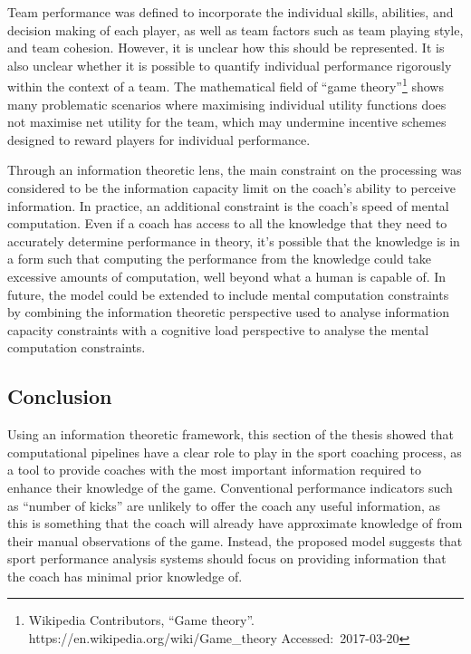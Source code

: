 Team performance was defined to incorporate the
individual skills, abilities, and decision making of each player, as
well as team factors such as team playing style, and team cohesion.
However, it is unclear how this should be represented. It is also
unclear whether it is possible to quantify individual performance
rigorously within the context of a team. The mathematical field of
``game theory''\footnote{Wikipedia Contributors, ``Game theory''.
  https://en.wikipedia.org/wiki/Game\_theory Accessed:~2017-03-20} shows
many problematic scenarios where maximising individual utility functions
does not maximise net utility for the team, which may undermine
incentive schemes designed to reward players for individual performance.

Through an information theoretic lens, the main constraint on the processing was considered to be the information capacity limit on the coach's ability to perceive
information. In practice, an additional constraint is the coach's speed
of mental computation. Even if a coach has access to all the knowledge
that they need to accurately determine performance in theory, it's
possible that the knowledge is in a form such that computing the
performance from the knowledge could take excessive amounts of
computation, well beyond what a human is capable of. In future, the model could be extended to include mental computation constraints by combining the information theoretic perspective used to analyse information capacity constraints with a cognitive load perspective to analyse the mental computation constraints.



\subsection{Conclusion}\label{conclusion-infotheory}

Using an information theoretic framework, this section of the thesis showed that computational pipelines have a clear role to play in the sport coaching
process, as a tool to provide coaches with the most important
information required to enhance their knowledge of the game. Conventional performance
indicators such as ``number of kicks'' are unlikely to offer the coach
any useful information, as this is something that the coach will already
have approximate knowledge of from their manual observations of the
game. Instead, the proposed model suggests that sport performance analysis systems should
focus on providing information that the coach has minimal prior
knowledge of.

